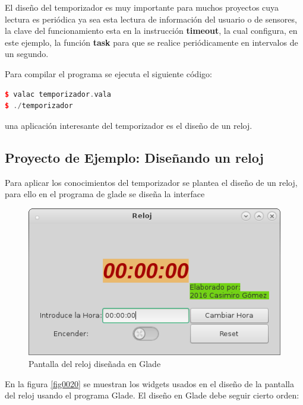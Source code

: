 \documentclass[12pt,twoside]{book}
\begin{document}
El diseño del temporizador es muy importante para muchos proyectos cuya lectura es periódica ya sea esta lectura de información del usuario o de sensores, la clave del funcionamiento esta en la instrucción \textbf{timeout}, la cual configura, en este ejemplo, la función \textbf{task} para que se realice periódicamente en intervalos de un segundo.

Para compilar el programa se ejecuta el siguiente código:

\begin{lstlisting}[language=C++]
$ valac temporizador.vala
$ ./temporizador
\end{lstlisting}

una aplicación interesante del temporizador es el diseño de un reloj.

\subsection{Proyecto de Ejemplo: Diseñando un reloj}

Para aplicar los conocimientos del temporizador se plantea el diseño de un reloj, para ello en el programa de glade se diseña la interface

\begin{figure}
	\centering
	\includegraphics[width=0.9\linewidth]{reloj.png}
	\caption{Pantalla del reloj diseñada en Glade}
	\label{fig0011}
\end{figure}
En la figura \ref{fig0020} se muestran los widgets usados en el diseño de la pantalla del reloj usando el programa Glade. El diseño en Glade debe seguir cierto orden:
\end{document}
